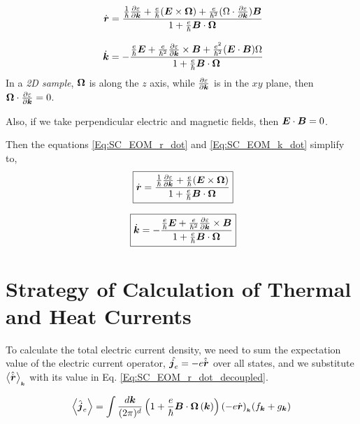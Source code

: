 \documentclass{revtex4-2}
\renewcommand\vec[1]{\ensuremath\boldsymbol{#1}} %
\begin{document}
\begin{equation}~\label{Eq:SC_EOM_r_dot}
	\dot{\vec{r}} = \frac{\frac{1}{\hbar} \frac{\partial \varepsilon}{\partial \vec{k}} + \frac{e}{\hbar} (\vec{E}\times\vec{\Omega}) + \frac{e}{\hbar^2} (\Omega \cdot \frac{\partial \varepsilon}{\partial \vec{k}} )\vec{B}}{1 + \frac{e}{\hbar} \vec{B}\cdot\vec{\Omega}}
\end{equation}

\begin{equation}~\label{Eq:SC_EOM_k_dot}
	\dot{\vec{k}} = -\frac{\frac{e}{\hbar} \vec{E} +\frac{e}{\hbar^2} \frac{\partial \varepsilon}{\partial \vec{k}} \times \vec{B} + \frac{e^2}{\hbar^2} (\vec{E}\cdot\vec{B})\Omega}{1 + \frac{e}{\hbar} \vec{B}\cdot\vec{\Omega}}
\end{equation}
In a \textit{2D sample}, $\vec{\Omega}$ is along the $z$ axis, while $\frac{\partial \varepsilon}{\partial \vec{k}}$ is in the $xy$ plane, then $\vec{\Omega} \cdot \frac{\partial \varepsilon}{\partial \vec{k}} = 0$.

Also, if we take perpendicular electric and magnetic fields, then $\vec{E}\cdot \vec{B} = 0$.

Then the equations \eqref{Eq:SC_EOM_r_dot} and \eqref{Eq:SC_EOM_k_dot} simplify to,
\begin{equation}~\label{Eq:SC_EOM_r_dot_decoupled}
	\boxed{\dot{\vec{r}} = \frac{\frac{1}{\hbar} \frac{\partial \varepsilon}{\partial \vec{k}} + \frac{e}{\hbar} (\vec{E}\times\vec{\Omega})}{1 + \frac{e}{\hbar} \vec{B}\cdot\vec{\Omega}}}
\end{equation}

\begin{equation}~\label{Eq:SC_EOM_k_dot_decoupled}
	\boxed{\dot{\vec{k}} = -\frac{\frac{e}{\hbar} \vec{E} +\frac{e}{\hbar^2} \frac{\partial \varepsilon}{\partial \vec{k}} \times \vec{B}}{1 + \frac{e}{\hbar} \vec{B}\cdot\vec{\Omega}}}
\end{equation}
\section{Strategy of Calculation of Thermal and Heat Currents}
To calculate the total electric current density, we need to sum the expectation value of the electric current operator, $\hat{\vec{j}_e} = -e \hat{\dot{\vec{r}}}$ over all states, and we substitute $\expval{\hat{\dot{\vec{r}}}}_{_{\vec{k}}}$ with its value in Eq. \eqref{Eq:SC_EOM_r_dot_decoupled}.

\begin{equation} \label{Eq:electric-current}
	\expval{\hat{\vec{j}}_e} = \int \frac{d\vec{k}}{(2\pi)^d} \left(1 + \frac{e}{\hbar} \vec{B} \cdot  \vec{\Omega}\left(\vec{k}\right)\right) (- e \dot{\vec{r}})_{_{\vec{k}}} ({f}_{\vec{k}} + {g}_{\vec{k}})
\end{equation}
\end{document}
